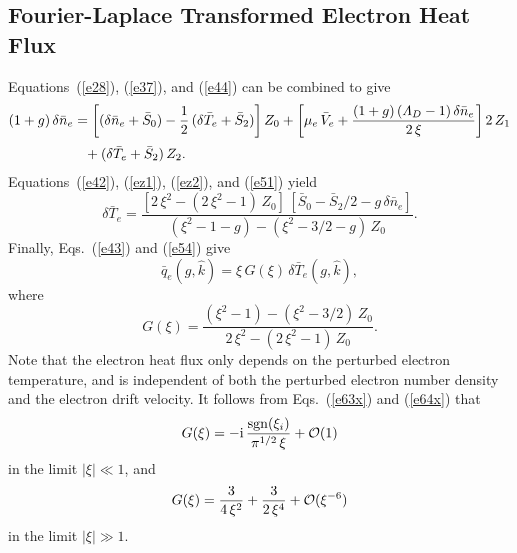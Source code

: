 \documentclass[12pt,prb,aps]{revtex4-1}
\begin{document}
\subsection{Fourier-Laplace Transformed Electron Heat Flux}
Equations~(\ref{e28}), (\ref{e37}), and (\ref{e44}) can be combined to give
\begin{align}\label{e51}
(1+g)\,\delta\bar{n}_e&=\left[(\delta\bar{n}_e+\bar{S}_0)-\frac{1}{2}\,(\delta\bar{T}_e+\bar{S}_2)\right]Z_0+\left[\mu_e\,\bar{V}_e+\frac{(1+g)\,({\mit\Lambda}_D-1)\,\delta\bar{n}_e}{2\,\xi}\right]2\,Z_1\nonumber\\[0.5ex]
&\phantom{=}
+(\delta\bar{T}_e+\bar{S}_2)\,Z_2.
\end{align}
Equations~(\ref{e42}), (\ref{ez1}), (\ref{ez2}), and (\ref{e51})
yield
\begin{equation}\label{e54}
\delta\bar{T}_e = \frac{[2\,\xi^2-(2\,\xi^2-1)\,Z_0]\,[\bar{S}_0-\bar{S}_2/2-g\,\delta\bar{n}_e]}{
(\xi^2-1-g)-(\xi^2-3/2-g)\,Z_0}.
\end{equation}
Finally, Eqs.~(\ref{e43}) and (\ref{e54}) give\,\cite{haz}
\begin{equation}\label{e55}
\bar{q}_e(g,\hat{k}) = \xi\,G(\xi)\,\delta\bar{T}_e(g,\hat{k}),
\end{equation}
where
\begin{equation}\label{e56}
G(\xi) = \frac{(\xi^2-1)-(\xi^2-3/2)\,Z_0}{2\,\xi^2-(2\,\xi^2-1)\,Z_0}.
\end{equation}
Note that the electron heat flux only depends on the perturbed electron temperature, and is independent of both the
perturbed electron number density and the electron drift velocity. 
It follows from Eqs.~(\ref{e63x}) and (\ref{e64x}) that
\begin{equation}
G(\xi) =-{\rm i}\,\frac{{\rm sgn}(\xi_i)}{\pi^{1/2}\,\xi}+{\cal O}(1)
\end{equation}
in the limit $|\xi|\ll 1$, and 
\begin{equation}
G(\xi)= \frac{3}{4\,\xi^2} + \frac{3}{2\,\xi^4} + {\cal O}(\xi^{-6}) 
\end{equation}
in the limit $|\xi|\gg 1$. 
\end{document}

